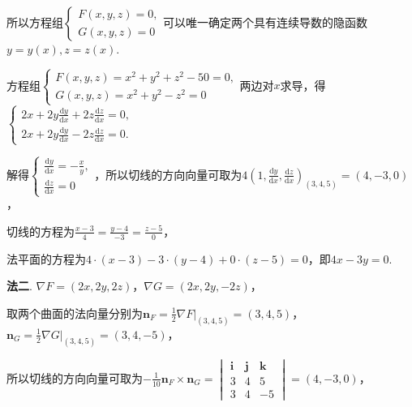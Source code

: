 \documentclass[../Main.tex]{subfiles}
\begin{document}
\begin{enumerate}
          所以方程组$\begin{cases}
                  F(x,y,z)=0, \\
                  G(x,y,z)=0
              \end{cases}$可以唯一确定两个具有连续导数的隐函数$y=y(x),z=z(x)$.

          方程组$\begin{cases}
                  F(x,y,z) = x^{2}+y^{2}+z^{2}-50=0, \\
                  G(x,y,z)=x^{2}+y^{2}-z^{2}=0
              \end{cases}$两边对$x$求导，得 $\begin{cases}
                  2x+2y\frac{\mathrm{d}y}{\mathrm{d}x}+2z\frac{\mathrm{d}z}{\mathrm{d}x}= 0, \\
                  2x+2y\frac{\mathrm{d}y}{\mathrm{d}x}-2z\frac{\mathrm{d}z}{\mathrm{d}x}= 0.
              \end{cases}$

          解得$\begin{cases}
                  \frac{\mathrm{d}y}{\mathrm{d}x} = -\frac{x}{y}, \\
                  \frac{\mathrm{d}z}{\mathrm{d}x} = 0
              \end{cases}$，所以切线的方向向量可取为$4\left(1,\frac{\mathrm{d}y}{\mathrm{d}x}
              ,\frac{\mathrm{d}z}{\mathrm{d}x}\right)_{(3,4,5)}=\left(4,-3,0\right)$，

          切线的方程为$\frac{x-3}{4}=\frac{y-4}{-3}=\frac{z-5}{0}$，

          法平面的方程为$4\cdot(x-3)-3\cdot(y-4)+0\cdot(z-5)=0$，即$4x-3y=0$.

          \textbf{法二}. $\nabla F = (2x,2y,2z)$，$\nabla G = (2x,2y,-2z)$，

          取两个曲面的法向量分别为$\boldsymbol{n}_{F}= \frac{1}{2}\nabla F|_{(3,4,5)}
              = (3,4,5)$，$\boldsymbol{n}_{G}= \frac{1}{2}\nabla G|_{(3,4,5)}= (3,4,-5)$，

          所以切线的方向向量可取为$-\frac{1}{10}\boldsymbol{n}_{F}\times \boldsymbol{n}
              _{G}=
              \begin{vmatrix}
                  \boldsymbol{i} & \boldsymbol{j} & \boldsymbol{k} \\
                  3              & 4              & 5              \\
                  3              & 4              & -5
              \end{vmatrix}
              = (4,-3,0)$，


\end{enumerate}
\end{document}
